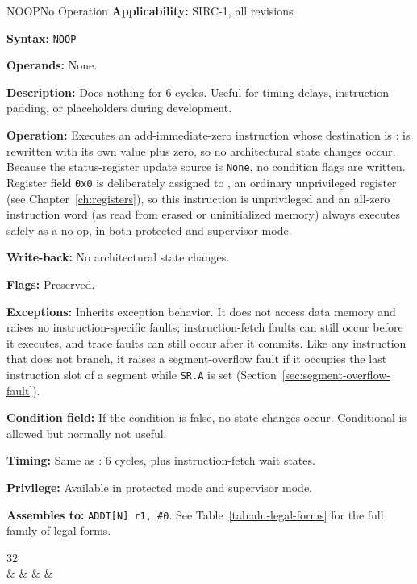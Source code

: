 \begin{instructionbox}{NOOP}{No Operation}
	\textbf{Applicability:} SIRC-1, all revisions

	\textbf{Syntax:} \texttt{NOOP}

	\textbf{Operands:} None.

	\textbf{Description:} Does nothing for 6 cycles. Useful for timing delays, instruction padding, or placeholders during
	development.

	\textbf{Operation:} Executes an add-immediate-zero instruction whose destination is :  is rewritten
	with its own value plus zero, so no architectural state changes occur. Because the status-register update source is
	\texttt{None}, no condition flags are written. Register field \texttt{0x0} is deliberately assigned to , an
	ordinary unprivileged register (see Chapter~\ref{ch:registers}), so this instruction is unprivileged and an all-zero
	instruction word (as read from erased or uninitialized memory) always executes safely as a no-op, in both protected
	and supervisor mode.

	\textbf{Write-back:} No architectural state changes.

	\textbf{Flags:} Preserved.

	\textbf{Exceptions:} Inherits  exception behavior. It does not access data memory and raises no
	instruction-specific faults; instruction-fetch faults can still occur before it executes, and trace faults can still
	occur after it commits. Like any instruction that does not branch, it raises a segment-overflow fault if it occupies
	the last instruction slot of a segment while \texttt{SR.A} is set (Section~\ref{sec:segment-overflow-fault}).

	\textbf{Condition field:} If the condition is false, no state changes occur. Conditional  is allowed but
	normally not useful.

	\textbf{Timing:} Same as : 6 cycles, plus instruction-fetch wait states.

	\textbf{Privilege:} Available in protected mode and supervisor mode.

	\textbf{Assembles to:} \texttt{ADDI[N] r1, \#0}. See Table~\ref{tab:alu-legal-forms} for the full family of legal forms.

	\begin{center}
		\begin{bytefield}[bitwidth=1.1em]{32}
			 \\
			 &
			 &
			 &
			 &
		\end{bytefield}
	\end{center}


\end{instructionbox}
